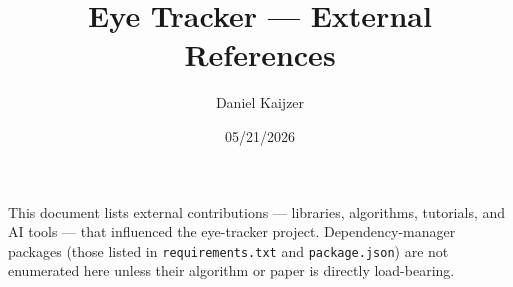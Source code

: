 \documentclass[11pt]{article}
\title{Eye Tracker --- External References}
\author{Daniel Kaijzer}
\date{05/21/2026}
\begin{document}
\maketitle

This document lists external contributions --- libraries, algorithms,
tutorials, and AI tools --- that influenced the eye-tracker project. Dependency-manager packages (those listed in
\texttt{requirements.txt} and \texttt{package.json}) are not enumerated
here unless their algorithm or paper is directly load-bearing.

\nocite{*}
\printbibliography[heading=none]
\end{document}
